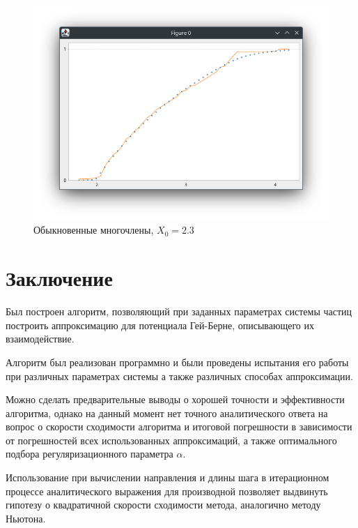 \documentclass[a4paper,14pt]{extarticle}
\begin{document}
    \begin{figure}[h]
        \centering
        \includegraphics[scale=0.5]{images/poly23}
        \caption{Обыкновенные многочлены, $X_0 = 2.3$}
    \end{figure}
    \newpage

    \section*{Заключение}

    Был построен алгоритм, позволяющий при заданных
    параметрах системы частиц построить аппроксимацию
    для потенциала Гей-Берне, описывающего их взаимодействие.

    Алгоритм был реализован программно и были проведены
    испытания его работы при различных параметрах системы
    а также различных способах аппроксимации.

    Можно сделать предварительные выводы о хорошей точности
    и эффективности алгоритма, однако на данный момент нет
    точного аналитического ответа на вопрос о скорости
    сходимости алгоритма и итоговой погрешности в
    зависимости от погрешностей всех использованных
    аппроксимаций, а также оптимального подбора
    регуляризационного параметра $\alpha$.

    Использование при вычислении направления и длины шага
    в итерационном процессе аналитического выражения для
    производной позволяет выдвинуть гипотезу о
    квадратичной скорости сходимости метода,
    аналогично методу Ньютона.

    \newpage
\end{document}
